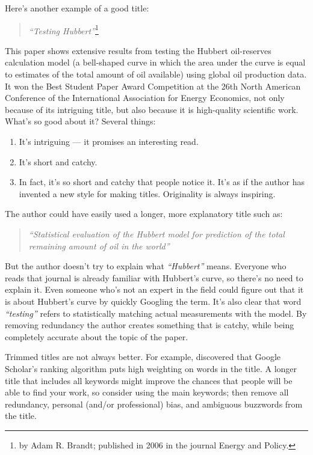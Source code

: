 \documentclass[graybox,envcountchap,sectrefs,UStrade]{svmono}
\begin{document}
Here's another example of a good title:

\begin{quote}
    \emph{``Testing Hubbert''}\footnote{by Adam R. Brandt; published in 2006 in the journal Energy and Policy.}
\end{quote}

This paper shows extensive results from testing the Hubbert oil-reserves calculation model (a bell-shaped curve in which the area under the curve is equal to estimates of the total amount of oil available) using global oil production data. It won the Best Student Paper Award Competition at the 26th North American Conference of the International Association for Energy Economics, not only because of its intriguing title, but also because it is high-quality scientific work. What's so good about it? Several things:

\begin{enumerate}
  \item It's intriguing --- it promises an interesting read.
  \item It's short and catchy.
  \item In fact, it's so short and catchy that people notice it. It's as if the author has invented a new style for  making titles. Originality is always inspiring.
\end{enumerate}

The author could have easily used a longer, more explanatory title such as:

\begin{quote}
    \emph{``Statistical evaluation of the Hubbert model for prediction of the total remaining amount of oil in the world''}
\end{quote}

But the author doesn't try to explain what \emph{``Hubbert''} means. Everyone who reads that journal is already familiar with Hubbert's curve, so there's no need to explain it. Even someone who's not an expert in the field could figure out that it is about Hubbert's curve by quickly Googling the term. It's also clear that word \emph{``testing''} refers to statistically matching actual measurements with the model. By removing redundancy the author creates something that is catchy, while being completely accurate about the topic of the paper. \par

Trimmed titles are not always better. For example, \citet{BeelGipp2009} discovered that Google Scholar's ranking algorithm puts high weighting on words in the title. A longer title that includes all keywords might improve the chances that people will be able to find your work, so consider using the main keywords; then remove all redundancy, personal (and/or professional) bias, and ambiguous buzzwords from the title.\par
\end{document}
